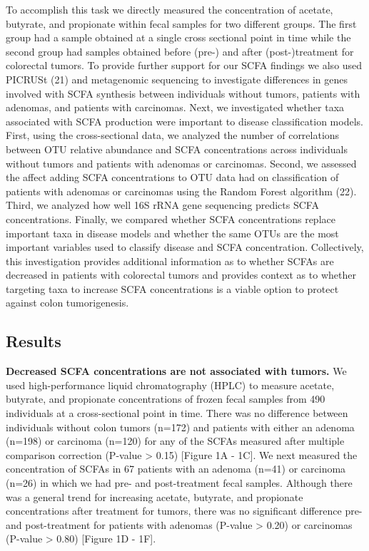 \documentclass[11pt,]{article}
\begin{document}
To accomplish this task we directly measured the concentration of
acetate, butyrate, and propionate within fecal samples for two different
groups. The first group had a sample obtained at a single cross
sectional point in time while the second group had samples obtained
before (pre-) and after (post-)treatment for colorectal tumors. To
provide further support for our SCFA findings we also used PICRUSt (21)
and metagenomic sequencing to investigate differences in genes involved
with SCFA synthesis between individuals without tumors, patients with
adenomas, and patients with carcinomas. Next, we investigated whether
taxa associated with SCFA production were important to disease
classification models. First, using the cross-sectional data, we
analyzed the number of correlations between OTU relative abundance and
SCFA concentrations across individuals without tumors and patients with
adenomas or carcinomas. Second, we assessed the affect adding SCFA
concentrations to OTU data had on classification of patients with
adenomas or carcinomas using the Random Forest algorithm (22). Third, we
analyzed how well 16S rRNA gene sequencing predicts SCFA concentrations.
Finally, we compared whether SCFA concentrations replace important taxa
in disease models and whether the same OTUs are the most important
variables used to classify disease and SCFA concentration. Collectively,
this investigation provides additional information as to whether SCFAs
are decreased in patients with colorectal tumors and provides context as
to whether targeting taxa to increase SCFA concentrations is a viable
option to protect against colon tumorigenesis.

\newpage

\subsection{Results}\label{results}

\textbf{Decreased SCFA concentrations are not associated with tumors.}
We used high-performance liquid chromatography (HPLC) to measure
acetate, butyrate, and propionate concentrations of frozen fecal samples
from 490 individuals at a cross-sectional point in time. There was no
difference between individuals without colon tumors (n=172) and patients
with either an adenoma (n=198) or carcinoma (n=120) for any of the SCFAs
measured after multiple comparison correction (P-value \textgreater{}
0.15) {[}Figure 1A - 1C{]}. We next measured the concentration of SCFAs
in 67 patients with an adenoma (n=41) or carcinoma (n=26) in which we
had pre- and post-treatment fecal samples. Although there was a general
trend for increasing acetate, butyrate, and propionate concentrations
after treatment for tumors, there was no significant difference pre- and
post-treatment for patients with adenomas (P-value \textgreater{} 0.20)
or carcinomas (P-value \textgreater{} 0.80) {[}Figure 1D - 1F{]}.
\end{document}
